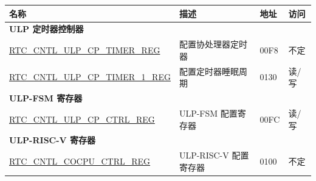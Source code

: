 \begin{longtable}{ | p{6cm} | p{7.2cm} | p{1.3cm} | p{1cm} | }
\hline\rowcolor{lightgray}
名称 & 描述 & 地址 & 访问 \\ \hline
\endhead
\multicolumn{4}{|l|}{\textbf{ULP 定时器控制器}} \\ \hline
\hyperref[regdesc:RTCCNTLULPCPTIMERREG]{RTC\_CNTL\_ULP\_CP\_TIMER\_REG} & 配置协处理器定时器 & \hexprefix{}00F8 & 不定 \\ \hline
\hyperref[regdesc:RTCCNTLULPCPTIMER1REG]{RTC\_CNTL\_ULP\_CP\_TIMER\_1\_REG} & 配置定时器睡眠周期 & \hexprefix{}0130 & 读/写 \\ \hline
\multicolumn{4}{|l|}{\textbf{ULP-FSM 寄存器}} \\ \hline
\hyperref[regdesc:RTCCNTLULPCPCTRLREG]{RTC\_CNTL\_ULP\_CP\_CTRL\_REG} & ULP-FSM 配置寄存器 & \hexprefix{}00FC & 读/写 \\ \hline
\multicolumn{4}{|l|}{\textbf{ULP-RISC-V 寄存器}} \\ \hline
\hyperref[regdesc:RTCCNTLCOCPUCTRLREG]{RTC\_CNTL\_COCPU\_CTRL\_REG} & ULP-RISC-V 配置寄存器 & \hexprefix{}0100 & 不定 \\ \hline
\end{longtable}

